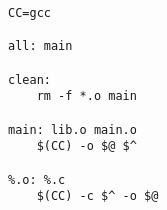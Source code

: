 \begin{lstlisting}
CC=gcc

all: main

clean:
    rm -f *.o main

main: lib.o main.o
    $(CC) -o $@ $^ 

%.o: %.c
    $(CC) -c $^ -o $@\end{lstlisting}
